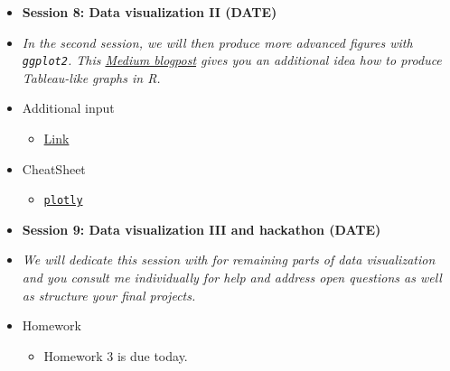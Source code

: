 \documentclass[12pt, a4paper]{article}
\begin{document}
\begin{itemize}
\vspace{-0.1cm}
\item[] \textbf{Session 8: Data visualization II (DATE)} 
\item[]\textit{In the second session, we will then produce more advanced figures with \texttt{ggplot2}. This \href{https://towardsdatascience.com/tableau-esque-drag-and-drop-gui-visualization-in-r-901ee9f2fe3f}{Medium blogpost} gives you an additional idea how to produce Tableau-like graphs in \textsf{R}.} 
{\color{darkgray}}
\item[] \faEdit \space Additional input
\begin{itemize} 
\item[$\square$] \href{url}{Link}
\end{itemize}
\item[] \faLightbulbO \space CheatSheet
\begin{itemize} 
\item[$\square$] \href{https://images.plot.ly/plotly-documentation/images/r_cheat_sheet.pdf}{\texttt{plotly}}
\end{itemize}

\vspace{0.5cm}
\item[] \textbf{Session 9: Data visualization III and hackathon (DATE)} 
\item[]\textit{We will dedicate this session with for remaining parts of data visualization and you consult me individually for help and address open questions as well as structure your final projects.}
\item[] \faExclamation \space Homework
\begin{itemize} 
\item[$\square$] Homework 3 is due today.
\end{itemize}


\end{itemize}
\end{document}
